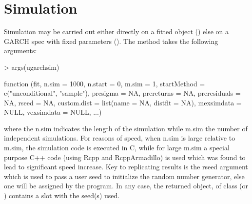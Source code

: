 \section{Simulation}\label{section:simulation}
Simulation may be carried out either directly on a fitted object (\verb@ugarchsim@)
else on a GARCH spec with fixed parameters (\verb@ugarchpath@). The \verb@ugarchsim@
method takes the following arguments:
\begin{Schunk}
\begin{Sinput}
> args(ugarchsim)
\end{Sinput}
\begin{Soutput}
function (fit, n.sim = 1000, n.start = 0, m.sim = 1, startMethod = c("unconditional",
    "sample"), presigma = NA, prereturns = NA, preresiduals = NA,
    rseed = NA, custom.dist = list(name = NA, distfit = NA),
    mexsimdata = NULL, vexsimdata = NULL, ...)
\end{Soutput}
\end{Schunk}
where the n.sim indicates the length of the simulation while m.sim the number of
independent simulations. For reasons of speed, when n.sim is large relative to
m.sim, the simulation code is executed in C, while for large m.sim a special
purpose C++ code (using Rcpp and RcppArmadillo) is used which was found to lead
to significant speed increase. Key to replicating results is the rseed argument
which is used to pass a user seed to initialize the random number generator, else
one will be assigned by the program. In any case, the returned object, of class
\verb@uGARCHsim@ (or \verb@uGARCHpath@) contains a slot with the seed(s) used.
